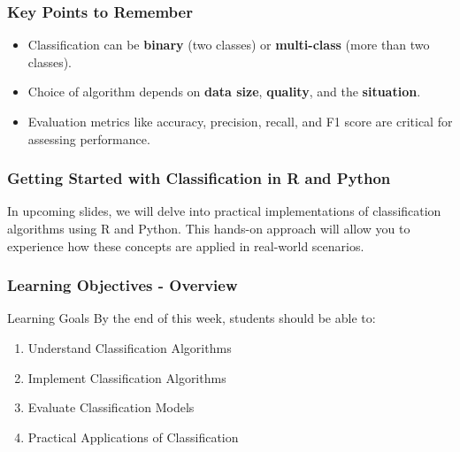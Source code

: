 \documentclass{beamer}
\begin{document}
\begin{frame}[fragile]
    \frametitle{Key Points to Remember}
    \begin{itemize}
        \item Classification can be \textbf{binary} (two classes) or \textbf{multi-class} (more than two classes).
        \item Choice of algorithm depends on \textbf{data size}, \textbf{quality}, and the \textbf{situation}.
        \item Evaluation metrics like accuracy, precision, recall, and F1 score are critical for assessing performance.
    \end{itemize}
\end{frame}

\begin{frame}[fragile]
    \frametitle{Getting Started with Classification in R and Python}
    In upcoming slides, we will delve into practical implementations of classification algorithms using R and Python. This hands-on approach will allow you to experience how these concepts are applied in real-world scenarios.
\end{frame}

\begin{frame}
    \frametitle{Learning Objectives - Overview}
    \begin{block}{Learning Goals}
        By the end of this week, students should be able to:
    \end{block}
    \begin{enumerate}
        \item Understand Classification Algorithms
        \item Implement Classification Algorithms
        \item Evaluate Classification Models
        \item Practical Applications of Classification
    \end{enumerate}
\end{frame}
\end{document}
